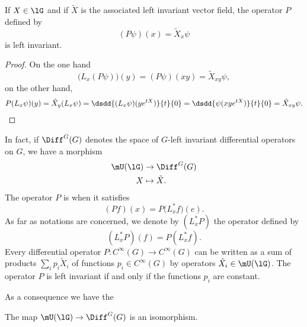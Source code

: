 \begin{lemma}
	If $X\in\lG$ and if $\tilde X$ is the associated left invariant vector field, the operator $P$ defined by 
	\begin{equation}
		(P\psi)(x)=\tilde X_{x}\psi
	\end{equation}
	is left invariant. 
\end{lemma}

\begin{proof}
	On the one hand
	\[ 
	  \big( L_{x}(P\psi) \big)(y)=(P\psi)(xy)=\tilde X_{xy}\psi,
	\]
	on the other hand,
	\begin{equation}
		\begin{aligned}[]
			P(L_{x}\psi)(y)=\tilde X_{y}(L_{x}\psi)
				=\dsdd{ (L_{x}\psi)(y e^{tX}) }{t}{0}
				=\dsdd{ \psi(xy e^{tX}) }{t}{0}
				=\tilde X_{xy}\psi.
		\end{aligned}
	\end{equation}
\end{proof}

In fact, if $\Diff^G(G)$ denotes the space of $G$-left invariant differential operators on $G$, we have a morphism
\begin{equation}		\label{EqMorphismUgDiff}
	\begin{aligned}
		\mU(\lG)&\to \Diff^{G}(G) \\
		X&\mapsto \tilde X. 
	\end{aligned}
\end{equation}
The operator $P$ is  when it satisfies
\begin{equation}
	(Pf)(x)=P\big( L_x^*f \big)(e).
\end{equation}
As far as notations are concerned, we denote by $(L^*_xP)$ the operator defined by
\begin{equation}
	(L^*_xP)(f)=P(L^*_xf).
\end{equation}
Every differential operator $P\colon  C^{\infty}(G)\to  C^{\infty}(G)$ can be written as a sum of products $\sum_ip_i\tilde X_i$ of functions $p_i\in C^{\infty}(G)$ by operators $\tilde X_i\in\mU(\lG)$. The operator $P$ is left invariant if and only if the functions $p_i$ are constant.

As a consequence we have the
\begin{corollary}	\label{CorUisomDiff}
	The map $\mU(\lG)\to\Diff^G(G)$ is an isomorphism.
\end{corollary}

